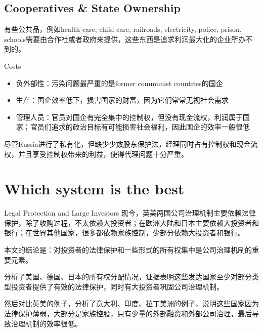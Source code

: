 \subsection[SOE]{Cooperatives \& State Ownership}%
	\begin{frame}{}
	有些公共品，例如health care, child care, railroads, electricity, police, prison, schools需要由合作社或者政府来提供，这些东西是追求利润最大化的企业所办不到的。\par
	 Costs
	\begin{itemize}
	\item 负外部性：污染问题最严重的是former communist countries的国企
	\item 生产：国企效率低下，损害国家的财富，因为它们常常无视社会需求
	\item 管理人员：官员对国企有完全集中的控制权，但没有现金流权，利润属于国家；官员们追求的政治目标有可能损害社会福利，因此国企的效率一般很低
	\end{itemize}
	 尽管Russia进行了私有化，但缺少少数股东保护法，经理同时占有控制权和现金流权，并且享受控制权带来的利益，使得代理问题十分严重。
\end{frame}

%

\section{Which system is the best}%
\begin{frame}{Legal Protection and Large Investors}
现今，英美两国公司治理机制主要依赖法律保护，除了收购过程，不太依赖大投资者；在欧洲大陆和日本主要依赖大投资者和银行；在世界其他国家，很多都依赖家族控制，少部分依赖大投资者和银行。\par
{} 本文的结论是：对投资者的法律保护和一些形式的所有权集中是公司治理机制的重要元素。\par
{} 分析了美国、德国、日本的所有权分配情况，证据表明这些发达国家至少对部分类型投资者提供了有效的法律保护，同时有大投资者巩固公司治理机制。\par
{} 然后对比英美的例子，分析了意大利、印度、拉丁美洲的例子，说明这些国家因为法律保护薄弱，大部分是家族控股，只有少量的外部融资和外部公司治理，最后导致治理机制的效率很低。
\end{frame}

